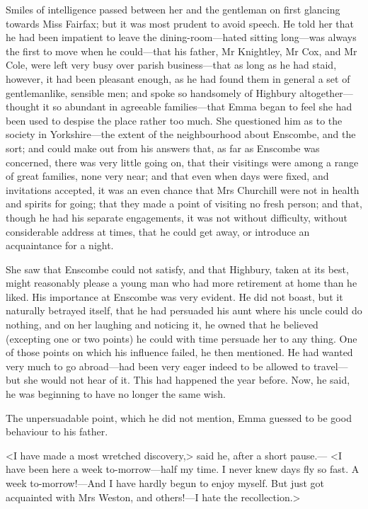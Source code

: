 Smiles of intelligence passed between her and the gentleman on first glancing towards Miss Fairfax; but it was most prudent to avoid speech. He told her that he had been impatient to leave the dining-room—hated sitting long—was always the first to move when he could—that his father, Mr Knightley, Mr Cox, and Mr Cole, were left very busy over parish business—that as long as he had staid, however, it had been pleasant enough, as he had found them in general a set of gentlemanlike, sensible men; and spoke so handsomely of Highbury altogether—thought it so abundant in agreeable families—that Emma began to feel she had been used to despise the place rather too much. She questioned him as to the society in Yorkshire—the extent of the neighbourhood about Enscombe, and the sort; and could make out from his answers that, as far as Enscombe was concerned, there was very little going on, that their visitings were among a range of great families, none very near; and that even when days were fixed, and invitations accepted, it was an even chance that Mrs Churchill were not in health and spirits for going; that they made a point of visiting no fresh person; and that, though he had his separate engagements, it was not without difficulty, without considerable address at times, that he could get away, or introduce an acquaintance for a night.

She saw that Enscombe could not satisfy, and that Highbury, taken at its best, might reasonably please a young man who had more retirement at home than he liked. His importance at Enscombe was very evident. He did not boast, but it naturally betrayed itself, that he had persuaded his aunt where his uncle could do nothing, and on her laughing and noticing it, he owned that he believed (excepting one or two points) he could with time persuade her to any thing. One of those points on which his influence failed, he then mentioned. He had wanted very much to go abroad—had been very eager indeed to be allowed to travel—but she would not hear of it. This had happened the year before. Now, he said, he was beginning to have no longer the same wish.

The unpersuadable point, which he did not mention, Emma guessed to be good behaviour to his father.

<I have made a most wretched discovery,> said he, after a short pause.— <I have been here a week to-morrow—half my time. I never knew days fly so fast. A week to-morrow!—And I have hardly begun to enjoy myself. But just got acquainted with Mrs Weston, and others!—I hate the recollection.>

